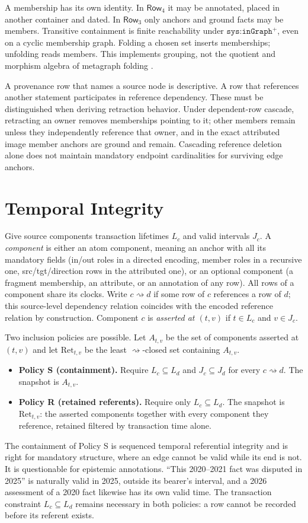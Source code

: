 \documentclass[11pt]{article}
\theoremstyle{plain}
\theoremstyle{definition}
\theoremstyle{remark}
\newcommand{\sys}[1]{\texttt{sys:#1}}
\newcommand{\NF}[1]{\mathsf{Row}_{#1}}
\newcommand{\dep}{\rightsquigarrow}
\begin{document}
A membership has its own identity. In $\NF4$ it may be annotated, placed in another
container and dated. In $\NF3$ only anchors and ground facts may be members.
Transitive containment is finite reachability under $\sys{inGraph}^{+}$, even on a cyclic
membership graph. Folding a chosen set inserts memberships; unfolding reads members.
This implements grouping, not the quotient and morphism algebra of metagraph folding
\cite{goertzel2020folding}.

A provenance row that names a source node is descriptive. A row that references another
statement participates in reference dependency. These must be distinguished when
deriving retraction behavior. Under dependent-row cascade, retracting an owner removes
memberships pointing to it; other members remain unless they independently reference that
owner, and in the exact attributed image member anchors are ground and remain. Cascading
reference deletion alone does not maintain mandatory endpoint cardinalities for surviving
edge anchors.

\section{Temporal Integrity}\label{sec:time}
Give source components transaction lifetimes $L_c$ and valid intervals $J_c$. A
\emph{component} is either an atom component, meaning an anchor with all its mandatory
fields (in/out roles in a directed encoding, member roles in a recursive one,
src/tgt/direction rows in the attributed one), or an optional component (a fragment
membership, an attribute, or an annotation of any row). All rows of a component share its
clocks. Write $c\dep d$ if some row of $c$ references a row of $d$; this source-level
dependency relation coincides with the encoded reference relation by construction.
Component $c$ is \emph{asserted at $(t,v)$} if $t\in L_c$ and $v\in J_c$.

Two inclusion policies are possible. Let $A_{t,v}$ be the set of components asserted at
$(t,v)$ and let $\mathrm{Ret}_{t,v}$ be the least $\dep$-closed set containing $A_{t,v}$.
\begin{itemize}
\item \textbf{Policy S (containment).} Require $L_c\subseteq L_d$ and $J_c\subseteq J_d$
for every $c\dep d$. The snapshot is $A_{t,v}$.
\item \textbf{Policy R (retained referents).} Require only $L_c\subseteq L_d$. The
snapshot is $\mathrm{Ret}_{t,v}$: the asserted components together with every component
they reference, retained filtered by transaction time alone.
\end{itemize}
The containment of Policy S is sequenced temporal referential integrity
\cite{kulkarni2012temporal} and is right for mandatory structure, where an edge cannot be
valid while its end is not. It is questionable for epistemic annotations. ``This 2020--2021
fact was disputed in 2025'' is naturally valid in 2025, outside its bearer's interval,
and a 2026 assessment of a 2020 fact likewise has its own valid time. The transaction
constraint $L_c\subseteq L_d$ remains necessary in both policies: a row cannot be recorded
before its referent exists.
\end{document}

